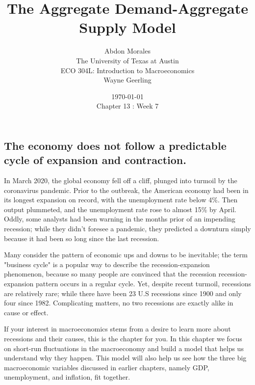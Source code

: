 \documentclass[11pt]{article} %
\title{The Aggregate Demand-Aggregate Supply Model}
\author{Abdon Morales \\ The University of Texas at Austin \\ ECO 304L: Introduction to Macroeconomics \\ Wayne Geerling}
\date{\today \\ Chapter 13 : Week 7}
\begin{document}
\maketitle
\subsection*{The economy does not follow a predictable cycle of expansion and contraction.}
In March 2020, the global economy fell off a cliff, plunged into turmoil by the coronavirus pandemic. Prior to the outbreak, the American economy had been in its longest expansion on record, with the unemployment rate below 4\%. Then output plummeted, and the unemployment rate rose to almost 15\% by April. Oddly, some analysts had been warning in the months prior of an impending recession; while they didn't foresee a pandemic, they predicted a downturn simply because it had been so long since the last recession.

Many consider the pattern of economic ups and downs to be inevitable; the term "business cycle" is a popular way to describe the recession-expansion phenomenon, because so many people are convinced that the recession recession-expansion pattern occurs in a regular cycle. Yet, despite recent turmoil, recessions are relatively rare; while there have been 23 U.S recessions since 1900 and only four since 1982. Complicating matters, no two recessions are exactly alike in cause or effect.

If your interest in macroeconomics stems from a desire to learn more about recessions and their causes, this is the chapter for you. In this chapter we focus on short-run fluctuations in the macroeconomy and build a model that helps us understand why they happen. This model will also help us see how the three big macroeconomic variables discussed in earlier chapters, namely GDP, unemployment, and inflation, fit together.
\end{document}
